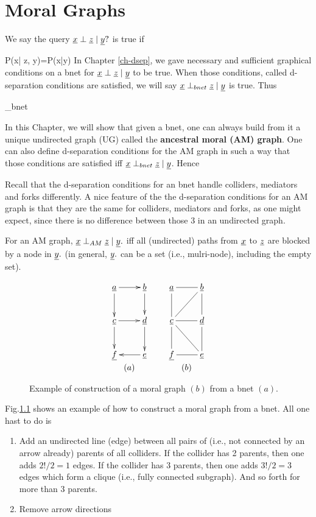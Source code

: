\documentclass[12pt]{report}
\begin{document}
\chapter{Moral Graphs}

We say the query $\rvx\perp\rvz\mid \rvy?$
is true if

\beq
P(x| z, y)=P(x|y)
\eeq
In Chapter \ref{ch-dsep},
we gave necessary and sufficient
graphical conditions on a bnet
for $\rvx\perp\rvz\mid \rvy$ to be true.
When those conditions, called d-separation conditions are
satisfied, we will say $\rvx\perp_{bnet} \rvz\mid \rvy$ is true. Thus

\beq
\rvx\perp \rvz\mid \rvy
\iff
\rvx\perp_{bnet} \rvz\mid \rvy
\eeq

In this Chapter, we will show that given
a bnet, one can always build from it a unique 
undirected graph (UG) called the {\bf ancestral
moral (AM) graph}.
One can also define d-separation
conditions for the AM graph in such a way that those conditions are satisfied iff 
$\rvx\perp_{bnet}\rvz\mid  \rvy$. Hence

\beq
{}
\label{eq-perp-bnet-AM}
\eeq
Recall that the d-separation conditions for
an bnet handle 
colliders, mediators and  forks differently.
A nice feature of the the d-separation conditions for an AM graph is that
they are the same for colliders, mediators and  forks, as one might 
expect, since there is no difference
between those 3 in an undirected graph.

For an AM graph, $\rvx\perp_{AM}\rvz\mid \rvy.$
iff all (undirected) paths from 
$\rvx$ to $\rvz$ are blocked by a node in $\rvy.$ (in general, $\rvy.$ can be a  set (i.e., mulri-node), including the empty set).


\begin{figure}[h!]
$$
\begin{array}{ccc}
\xymatrix{
\rva\ar[r]\ar[d]
&{\rvb}\ar[d]
\\
{\rvc}\ar[r]\ar[d]
&{\rvd}\ar[d]
\\
\rvf
&\rve\ar[l]
}
&&
\xymatrix{
\rva\ar@{-}[r]\ar@{-}[d]
&{\rvb}\ar@{-}[d]\ar@{-}[dl]
\\
{\rvc}\ar@{-}[r]\ar@{-}[d]\ar@{-}[dr]
&{\rvd}\ar@{-}[d]
\\
\rvf
&\rve\ar@{-}[l]
}
\\
(a)
&& (b)
\end{array}
$$
\caption{Example of construction of a moral graph $(b)$ from a bnet $(a)$.}
\label{fig-moral-g}
\end{figure}
Fig.\ref{fig-moral-g}
shows an example of how to construct a
moral graph from a bnet.
All one hast to do is 
\begin{enumerate}
\item Add an undirected line (edge) between all 
pairs of  (i.e., not connected by an arrow already) parents of all colliders. If the collider
has 2 parents, then one adds $2!/2=1$ edges.
If the collider has 3 parents, then one adds $3!/2=3$ edges which form a clique (i.e.,
fully connected subgraph). And so forth
for more than 3 parents.
\item Remove arrow directions
\end{enumerate}
\end{document}
